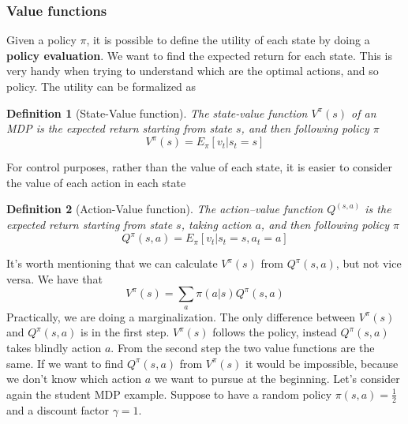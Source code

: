 \documentclass[main.tex]{subfiles}
\newtheorem{definition}{Definition}[section]
\begin{document}
\subsubsection{Value functions}
Given a policy $\pi$, it is possible to define the utility of each state by doing a \textbf{policy evaluation}. We want to find the expected return for each state. This is very handy when trying to understand which are the optimal actions, and so policy. The utility can be formalized as
\begin{definition}[State-Value function]
The state-value function $V^{\pi}(s)$ of an MDP is the expected return starting from state $s$, and then following policy $\pi$
\begin{equation*}
    V^{\pi}(s) = E_{\pi}[v_t|s_t=s]
\end{equation*}
\end{definition}
For control purposes, rather than the value of each state, it is easier to consider the value of each action in each state
\begin{definition}[Action-Value function]
The action–value function $Q^(s, a)$ is the expected return starting from state $s$, taking action $a$,
and then following policy $\pi$
\begin{equation*}
    Q^{\pi}(s,a) = E_{\pi}[v_t|s_t=s, a_t=a]
\end{equation*}
\end{definition}
It's worth mentioning that we can calculate $V^{\pi}(s)$ from $Q^{\pi}(s, a)$, but not vice versa. We have that
\begin{equation}
    V^{\pi}(s) = \sum_a \pi(a|s) Q^{\pi}(s,a)
\end{equation}
Practically, we are doing a marginalization\footnotemark. The only difference between $V^{\pi}(s)$ and $Q^{\pi}(s, a)$ is in the first step. $V^{\pi}(s)$ follows the policy, instead $Q^{\pi}(s, a)$ takes blindly action $a$. From the second step the two value functions are the same. If we want to find $Q^{\pi}(s, a)$ from $V^{\pi}(s)$ it would be impossible, because we don't know which action $a$ we want to pursue at the beginning.
Let's consider again the student MDP example. Suppose to have a random policy $\pi(s,a)=\frac{1}{2}$ \footnotemark{} and a discount factor $\gamma=1$.
\end{document}
